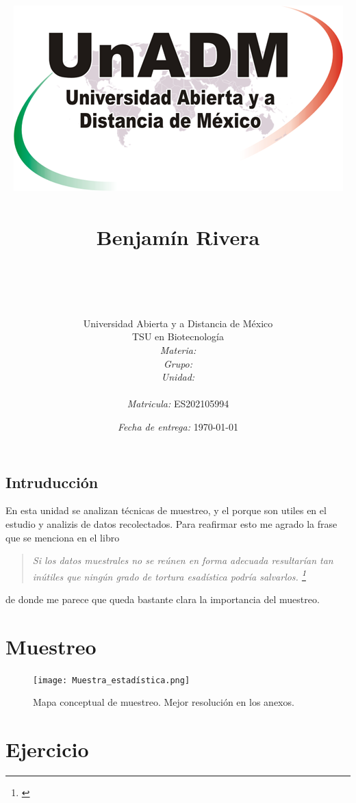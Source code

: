 \documentclass[12pt]{article}
\title{
	\includegraphics{../../../assets/logo-unadm} \\
	\ \\ Benjam\'in Rivera \\
	\bf{\titulo}\\\ \\}
\author{
	Universidad Abierta y a Distancia de México \\
	TSU en Biotecnolog\'ia \\
	\textit{Materia:} \materia \\
	\textit{Grupo:} \grupo \\
	\textit{Unidad:} \unidad \\
	\\
	\textit{Matricula:} ES202105994 }
\date{\textit{Fecha de entrega:} \today}
\begin{document}
\maketitle\newpage

\subsection*{Intruducci\'on}

	\par En esta unidad se analizan técnicas de muestreo, y el porque son utiles en el estudio y analizis de datos recolectados. Para reafirmar esto me agrado la frase que se menciona en el libro
	
	\begin{quote}
		\it Si los datos muestrales no se reúnen en forma adecuada resultarían tan inútiles que ningún grado de tortura esadística podría salvarlos. \footnote{\cite[p 6]{basica}}
	\end{quote}
	
	\noindent de donde me parece que queda bastante clara la importancia del muestreo.
	
\section*{Muestreo}
	\begin{figure}[h]
		\centering
		\texttt{[image: Muestra\_estadística.png]}
		\caption{Mapa conceptual de muestreo. Mejor resolución en los anexos.}
		\label{mapa conceptual}
	\end{figure}
		
\section*{Ejercicio}
\end{document}
